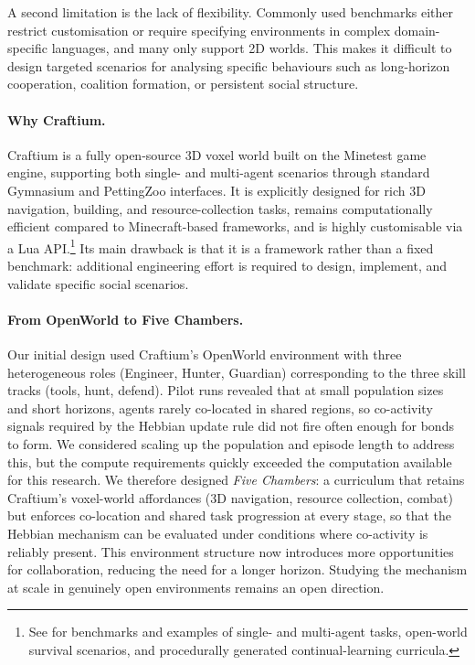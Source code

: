 \documentclass{article}
\theoremstyle{plain}
\theoremstyle{definition}
\theoremstyle{remark}
\begin{document}
A second limitation is the lack of flexibility. Commonly used benchmarks either restrict customisation or require specifying environments in complex domain-specific languages, and many only support 2D worlds. This makes it difficult to design targeted scenarios for analysing specific behaviours such as long-horizon cooperation, coalition formation, or persistent social structure.

\paragraph{Why Craftium.} Craftium \cite{malagoncraftium} is a fully open-source 3D voxel world built on the Minetest game engine, supporting both single- and multi-agent scenarios through standard Gymnasium and PettingZoo interfaces. It is explicitly designed for rich 3D navigation, building, and resource-collection tasks, remains computationally efficient compared to Minecraft-based frameworks, and is highly customisable via a Lua API.\footnote{See \cite{malagoncraftium} for benchmarks and examples of single- and multi-agent tasks, open-world survival scenarios, and procedurally generated continual-learning curricula.} Its main drawback is that it is a framework rather than a fixed benchmark: additional engineering effort is required to design, implement, and validate specific social scenarios.

\paragraph{From OpenWorld to Five Chambers.} Our initial design used Craftium's OpenWorld environment with three heterogeneous roles (Engineer, Hunter, Guardian) corresponding to the three skill tracks (tools, hunt, defend). Pilot runs revealed that at small population sizes and short horizons, agents rarely co-located in shared regions, so co-activity signals required by the Hebbian update rule did not fire often enough for bonds to form. We considered scaling up the population and episode length to address this, but the compute requirements quickly exceeded the computation available for this research. We therefore designed \emph{Five Chambers}: a curriculum that retains Craftium's voxel-world affordances (3D navigation, resource collection, combat) but enforces co-location and shared task progression at every stage, so that the Hebbian mechanism can be evaluated under conditions where co-activity is reliably present. This environment structure now introduces more opportunities for collaboration, reducing the need for a longer horizon. Studying the mechanism at scale in genuinely open environments remains an open direction.
\end{document}
